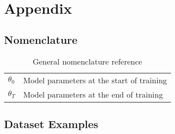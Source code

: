 \chapter{Appendix}
\section{Nomenclature}
\begin{table}[htb]
    \centering
    \begin{tabular}{ll}
        $\theta_0$ & Model parameters at the start of training \\ 
        $\theta_T$ & Model parameters at the end of training \\
    \end{tabular}
    \caption{General nomenclature reference}
    \label{tab:nomenclature}
\end{table}

\section{Dataset Examples}

